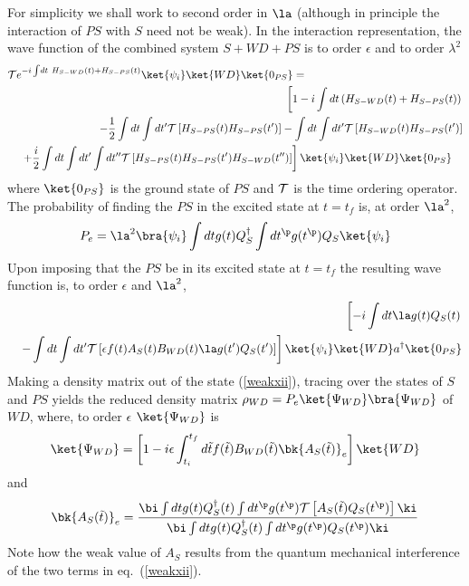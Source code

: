 \documentclass[12pt]{article}
\begin{document}
For simplicity we shall work to second order in $\la$ (although in principle
the interaction of $PS$ with $S$ need not be weak).
In the interaction
representation, the wave function of the combined system $S+WD+PS$ is
to order $\epsilon$ and to order $\lambda^2$
\begin{eqnarray}
\lefteqn{{\cal T} e^{-i \int\! dt \ H_{S-WD}(t) + H_{S-PS}(t)}
\ket{\psi_i}\ket{WD}\ket{0_{PS}}=}\nonumber\\
& & \left[
1 -i \int dt \left( H_{S-WD}(t) + H_{S-PS}(t) \right)\right.
\nonumber\\
& & \ -{1 \over 2}
\int dt \int dt^\prime
{\cal T}\left[ H_{S-PS}(t)  H_{S-PS}(t^\prime) \right]
-
\int dt \int dt^\prime
{\cal T}\left[ H_{S-WD}(t)  H_{S-PS}(t^\prime) \right]
\nonumber\\
& & \left.\
+{i \over 2}
\int dt \int dt^\prime\int dt^{\prime\prime}
{\cal T}\left[ H_{S-PS}(t)  H_{S-PS}(t^\prime)
 H_{S-WD}(t^{\prime\prime})\right]
\right]
\ket{\psi_i}\ket{WD}\ket{0_{PS}}\quad
\label{weakxi}
\end{eqnarray}
where $\ket{0_{PS}}$ is the ground state of $PS$ and ${\cal T}$ is
the time ordering operator.
The probability of finding the $PS$ in the excited state at $t=t_f$ is,
at order $\la^2$,
\begin{equation}
P_{e}
= \la^2  \bra{\psi_i} \int dt g(t) Q^\dagger_S
\int dt^\p g(t^\p) Q_S \ket{\psi_i}
\end{equation}
Upon imposing that the
$PS$ be in its excited state at $t=t_f$ the
resulting
wave function  is, to order $\epsilon$ and $\la^2$,
\begin{eqnarray}
&&\quad \left [
-i \int dt \la g(t) Q_S(t)  \right.
\nonumber\\
&& \left. -
\int dt \int dt^\prime
{\cal T}
\left[\epsilon f(t) A_S(t) B_{WD}(t) \la g(t^\prime) Q_S(t^\prime)
\right]
\right]
\ket{\psi_i}\ket{WD}a^\dagger\ket{0_{PS}}
\label{weakxii}\end{eqnarray}
Making a density matrix out of the state (\ref{weakxii}),
tracing over the states of $S$ and $PS$
yields the reduced density matrix $\rho_{WD} =
P_{e}\ket{\Psi_{WD}}\bra{\Psi_{WD}}$ of $WD$, where, to order $\epsilon$
$\ket{\Psi_{WD}}$ is
\begin{equation}
\ket{\Psi_{WD}}=\left[
1 - i \epsilon \int_{t_i}^{t_f} d\tilde t f(\tilde t) B_{WD}(\tilde t)
\bk{A_{S}(\tilde t)}_{e} \right] \ket{WD}
\label{weakxiii}
\end{equation}
and
\begin{equation}
\bk{A_{S}(\tilde t)}_{e} =
{ \bi \int dt g(t) Q_S^\dagger (t)  \int dt^\p
g(t^\p) {\cal T } \left[ A_S(\tilde t) Q_S(t^\p) \right]
\ki \over \bi \int dt g(t) Q_S^\dagger (t) \int
dt^\p g(t^\p) Q_S(t^\p) \ki} \label{weakxiv} \end{equation}
Note how the weak value of $A_S$ results from the quantum mechanical
interference of the two terms in eq.~(\ref{weakxii}).
\end{document}
